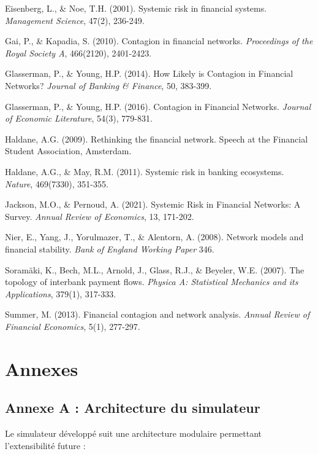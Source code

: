 \documentclass[12pt,a4paper,twoside]{article}
\begin{document}
Eisenberg, L., \& Noe, T.H. (2001). Systemic risk in financial systems. \textit{Management Science}, 47(2), 236-249.

Gai, P., \& Kapadia, S. (2010). Contagion in financial networks. \textit{Proceedings of the Royal Society A}, 466(2120), 2401-2423.

Glasserman, P., \& Young, H.P. (2014). How Likely is Contagion in Financial Networks? \textit{Journal of Banking \& Finance}, 50, 383-399.

Glasserman, P., \& Young, H.P. (2016). Contagion in Financial Networks. \textit{Journal of Economic Literature}, 54(3), 779-831.

Haldane, A.G. (2009). Rethinking the financial network. Speech at the Financial Student Association, Amsterdam.

Haldane, A.G., \& May, R.M. (2011). Systemic risk in banking ecosystems. \textit{Nature}, 469(7330), 351-355.

Jackson, M.O., \& Pernoud, A. (2021). Systemic Risk in Financial Networks: A Survey. \textit{Annual Review of Economics}, 13, 171-202.

Nier, E., Yang, J., Yorulmazer, T., \& Alentorn, A. (2008). Network models and financial stability. \textit{Bank of England Working Paper} 346.

Soramäki, K., Bech, M.L., Arnold, J., Glass, R.J., \& Beyeler, W.E. (2007). The topology of interbank payment flows. \textit{Physica A: Statistical Mechanics and its Applications}, 379(1), 317-333.

Summer, M. (2013). Financial contagion and network analysis. \textit{Annual Review of Financial Economics}, 5(1), 277-297.

\newpage

\section*{Annexes}

\subsection*{Annexe A : Architecture du simulateur}

Le simulateur développé suit une architecture modulaire permettant l'extensibilité future :
\end{document}
